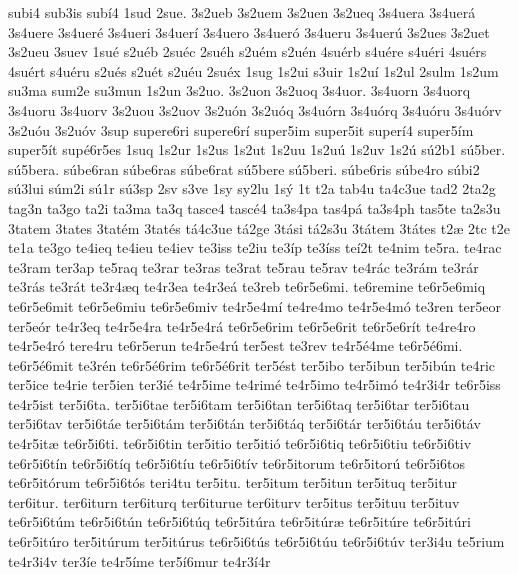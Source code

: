 {subi4
sub3is
sub^^ed4
1sud
2sue.
3s2ueb
3s2uem
3s2uen
3s2ueq
3s4uera
3s4uer^^e1
3s4uere
3s4uer^^e9
3s4ueri
3s4uer^^ed
3s4uero
3s4uer^^f3
3s4ueru
3s4uer^^fa
3s2ues
3s2uet
3s2ueu
3suev
1su^^e9
s2u^^e9b
2su^^e9c
2su^^e9h
s2u^^e9m
s2u^^e9n
4su^^e9rb
s4u^^e9re
s4u^^e9ri
4su^^e9rs
4su^^e9rt
s4u^^e9ru
s2u^^e9s
s2u^^e9t
s2u^^e9u
2su^^e9x
1sug
1s2ui
s3uir
1s2u^^ed
1s2ul
2sulm
1s2um
su3ma
sum2e
su3mun
1s2un
3s2uo.
3s2uon
3s2uoq
3s4uor.
3s4uorn
3s4uorq
3s4uoru
3s4uorv
3s2uou
3s2uov
3s2u^^f3n
3s2u^^f3q
3s4u^^f3rn
3s4u^^f3rq
3s4u^^f3ru
3s4u^^f3rv
3s2u^^f3u
3s2u^^f3v
3sup
supere6ri
supere6r^^ed
super5im
super5it
super^^ed4
super5^^edm
super5^^edt
sup^^e96r5es
1suq
1s2ur
1s2us
1s2ut
1s2uu
1s2u^^fa
1s2uv
1s2^^fa
s^^fa2b1
s^^fa5ber.
s^^fa5bera.
s^^fabe6ran
s^^fabe6ras
s^^fabe6rat
s^^fa5bere
s^^fa5beri.
s^^fabe6ris
s^^fabe4ro
s^^fabi2
s^^fa3lui
s^^fam2i
s^^fa1r
s^^fa3sp
2sv
s3ve
1sy
sy2lu
1s^^fd
1t
t2a
tab4u
ta4c3ue
tad2
2ta2g
tag3n
ta3go
ta2i
ta3ma
ta3q
tasce4
tasc^^e94
ta3s4pa
tas4p^^e1
ta3s4ph
tas5te
ta2s3u
3tatem
3tates
3tat^^e9m
3tat^^e9s
t^^e14c3ue
t^^e12ge
3t^^e1si
t^^e12s3u
3t^^e1tem
3t^^e1tes
t2^^e6
2tc
t2e
te1a
te3go
te4ieq
te4ieu
te4iev
te3iss
te2iu
te3^^edp
te3^^edss
te^^ed2t
te4nim
te5ra.
te4rac
te3ram
ter3ap
te5raq
te3rar
te3ras
te3rat
te5rau
te5rav
te4r^^e1c
te3r^^e1m
te3r^^e1r
te3r^^e1s
te3r^^e1t
te3r4^^e6q
te4r3ea
te4r3e^^e1
te3reb
te6r5e6mi.
te6remine
te6r5e6miq
te6r5e6mit
te6r5e6miu
te6r5e6miv
te4r5e4m^^ed
te4re4mo
te4r5e4m^^f3
te3ren
ter5eor
ter5e^^f3r
te4r3eq
te4r5e4ra
te4r5e4r^^e1
te6r5e6rim
te6r5e6rit
te6r5e6r^^edt
te4re4ro
te4r5e4r^^f3
tere4ru
te6r5erun
te4r5e4r^^fa
ter5est
te3rev
te4r5^^e94me
te6r5^^e96mi.
te6r5^^e96mit
te3r^^e9n
te6r5^^e96rim
te6r5^^e96rit
ter5^^e9st
ter5ibo
ter5ibun
ter5ib^^fan
te4ric
ter5ice
te4rie
ter5ien
ter3i^^e9
te4r5ime
te4rim^^e9
te4r5imo
te4r5im^^f3
te4r3i4r
te6r5iss
te4r5ist
ter5i6ta.
ter5i6tae
ter5i6tam
ter5i6tan
ter5i6taq
ter5i6tar
ter5i6tau
ter5i6tav
ter5i6t^^e1e
ter5i6t^^e1m
ter5i6t^^e1n
ter5i6t^^e1q
ter5i6t^^e1r
ter5i6t^^e1u
ter5i6t^^e1v
te4r5it^^e6
te6r5i6ti.
te6r5i6tin
ter5itio
ter5iti^^f3
te6r5i6tiq
te6r5i6tiu
te6r5i6tiv
te6r5i6t^^edn
te6r5i6t^^edq
te6r5i6t^^edu
te6r5i6t^^edv
te6r5itorum
te6r5itor^^fa
te6r5i6tos
te6r5it^^f3rum
te6r5i6t^^f3s
teri4tu
ter5itu.
ter5itum
ter5itun
ter5ituq
ter5itur
ter6itur.
ter6iturn
ter6iturq
ter6iturue
ter6iturv
ter5itus
ter5ituu
ter5ituv
te6r5i6t^^fam
te6r5i6t^^fan
te6r5i6t^^faq
te6r5it^^fara
te6r5it^^far^^e6
te6r5it^^fare
te6r5it^^fari
te6r5it^^faro
ter5it^^farum
ter5it^^farus
te6r5i6t^^fas
te6r5i6t^^fau
te6r5i6t^^fav
ter3i4u
te5rium
te4r3i4v
ter3^^ede
te4r5^^edme
ter5^^ed6mur
te4r3^^ed4r
}
